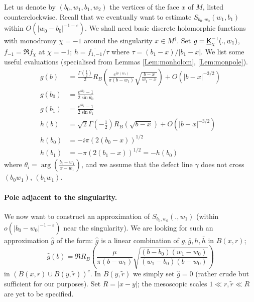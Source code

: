 \documentclass[10pt]{article}
\newcommand{\eps}{\varepsilon}
\newcommand{\uK}{{\underline {\sf K}}}
\newcommand{\dg}{\dagger}
\begin{document}
Let us denote by $(b_0,w_1,b_1,w_2)$ the vertices of the face $x$ of $M$, listed counterclockwise. Recall that we eventually want to estimate $S_ {b_0,w_0}(w_1,b_1)$ within $O(|w_0-b_0|^{-1-\eps})$. We shall need basic discrete holomorphic functions with monodromy $\chi=-1$ around the singularity $x\in M^\dg$. Set $g=\uK_{\chi}^{-1}(.,w_1)$, $f_{-1}=\Re f_\chi$ at $\chi=-1$; $h=\overline{f_{1,-1}}/\tau$ where $\tau=(b_1-x)/|b_1-x|$. We list some useful evaluations (specialised from Lemmas \ref{Lem:monholom}, \ref{Lem:monpole}). 
\begin{equation}\label{eq:magnevals}
\begin{split}
g(b)&=\frac{\Gamma(\frac 12)}{2}R_B\left(\frac{e^{i\nu(w_1)}}{\pi(b-w_1)}\sqrt{\frac{b-x}{w_1-x}}\right)+O(|b-x|^{-3/2})\\
g(b_0)&=\frac{e^{i\theta_0}-1}{2\sin\theta_0}\\
g(b_1)&=\frac{e^{i\theta_1}-1}{2\sin\theta_1}\\
h(b)&=\sqrt 2\Gamma(-\frac 12)R_B(\sqrt{b-x})+O(|b-x|^{-3/2})\\
h(b_0)&=-i\pi(2(b_0-x))^{1/2}\\
h(b_1)&=-\pi (2(b_1-x))^{1/2}=-h(b_0)
%
%
%
%
%
\end{split}\end{equation}
where $\theta_i=\arg(\frac{b_i-w_1}{x-w_1})$, and we assume that the defect line $\gamma$ does not cross $(b_0w_1)$, $(b_1w_1)$. 
%
%



\paragraph{Pole adjacent to the singularity.\\}

We now want to construct an approximation of $S_{b_0,w_0}(.,w_1)$ (within $o(|b_0-w_0|^{-1-\eps})$ near the singularity). We are looking for such an approximation $\hat g$ of the form: $\hat g$ is a linear combination of $g,\bar g,h,\bar h$ in $B(x,r)$; 
\begin{equation}\label{eq:magnhatgmacr}
\hat g(b)=\Re R_B\left(\frac{\mu}{\pi(b-w_1)}\sqrt{\frac{(b-b_0)(w_1-w_0)}{(w_1-b_0)(b-w_0)}}\right)
\end{equation}
in $(B(x,r)\cup B(y,\tilde r))^c$. %
In $B(y,\tilde r)$ we simply set $\hat g=0$ (rather crude but sufficient for our purposes). 
Set $R=|x-y|$; the mesoscopic scales $1\ll r,\tilde r\ll R$ are yet to be specified.
\end{document}
